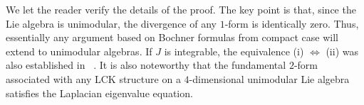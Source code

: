 \documentclass[a4paper,11pt]{amsart}
\theoremstyle{definition}
\renewcommand{\[}{\begin{equation*}}
\renewcommand{\]}{\end{equation*}}
\begin{document}
We let the reader verify the details of the proof. The key point is that, since the Lie algebra is unimodular, the divergence of any $1$-form is identically zero. Thus, essentially any argument based on Bochner formulas from compact case will extend to unimodular algebras. If $J$ is integrable, the equivalence (i) $\Leftrightarrow$ (ii) was also established in ~\cite{MR3397500}. It is also noteworthy that the fundamental $2$-form associated with any LCK structure on a $4$-dimensional unimodular Lie algebra satisfies the Laplacian eigenvalue equation.
\end{document}
